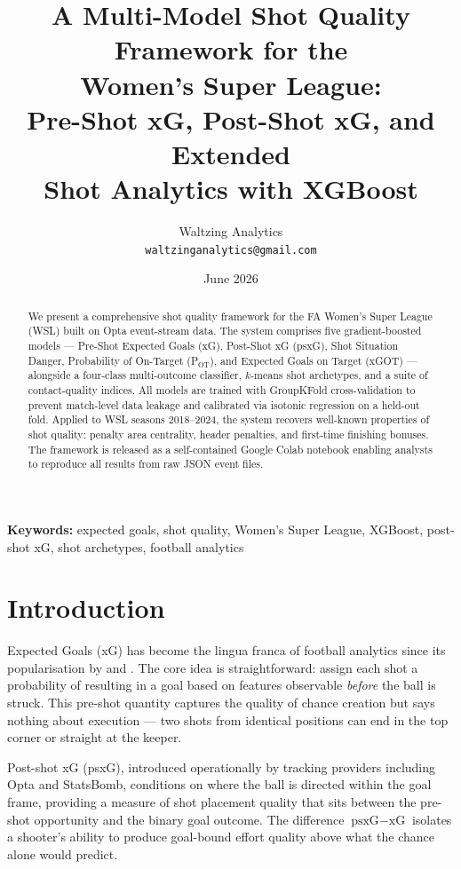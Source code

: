 \documentclass[12pt,a4paper]{article}
\title{\textbf{A Multi-Model Shot Quality Framework for the\\
Women's Super League:\\
Pre-Shot xG, Post-Shot xG, and Extended\\
Shot Analytics with XGBoost}}
\author{
    Waltzing Analytics\\
    \texttt{waltzinganalytics@gmail.com}
}
\date{June 2026}
\begin{document}
\maketitle
\thispagestyle{empty}

\begin{abstract}
\noindent
We present a comprehensive shot quality framework for the FA Women's Super League (WSL) built on Opta event-stream data. The system comprises five gradient-boosted models — Pre-Shot Expected Goals (xG), Post-Shot xG (psxG), Shot Situation Danger, Probability of On-Target (P$_{\text{OT}}$), and Expected Goals on Target (xGOT) — alongside a four-class multi-outcome classifier, $k$-means shot archetypes, and a suite of contact-quality indices. All models are trained with GroupKFold cross-validation to prevent match-level data leakage and calibrated via isotonic regression on a held-out fold. Applied to WSL seasons 2018–2024, the system recovers well-known properties of shot quality: penalty area centrality, header penalties, and first-time finishing bonuses. The framework is released as a self-contained Google Colab notebook enabling analysts to reproduce all results from raw JSON event files.
\end{abstract}

\vspace{0.5em}
\noindent\textbf{Keywords:} expected goals, shot quality, Women's Super League, XGBoost, post-shot xG, shot archetypes, football analytics

\newpage
\tableofcontents
\newpage

\section{Introduction}
\label{sec:intro}

Expected Goals (xG) has become the lingua franca of football analytics since its popularisation by \citet{caley2013} and \citet{rathke2017}. The core idea is straightforward: assign each shot a probability of resulting in a goal based on features observable \emph{before} the ball is struck. This pre-shot quantity captures the quality of chance creation but says nothing about execution — two shots from identical positions can end in the top corner or straight at the keeper.

Post-shot xG (psxG), introduced operationally by tracking providers including Opta and StatsBomb, conditions on where the ball is directed within the goal frame, providing a measure of shot placement quality that sits between the pre-shot opportunity and the binary goal outcome. The difference $\text{psxG} - \text{xG}$ isolates a shooter's ability to produce goal-bound effort quality above what the chance alone would predict.
\end{document}

